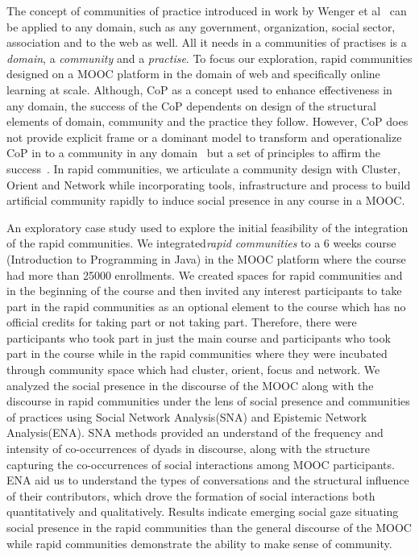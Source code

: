 \documentclass[manuscript,screen,review]{acmart}
\begin{document}
The concept of communities of practice introduced in work by Wenger et al~\cite{wenger1999communities} can be applied to any domain, such as any government, organization, social sector, association and to the web as well. All it needs in a communities of practises is a \textit{domain}, a \textit{community} and a \textit{practise}. To focus our exploration, rapid communities designed on a MOOC platform in the domain of web and specifically online learning at scale. Although, CoP as a concept used to enhance effectiveness in any domain, the success of the CoP dependents on design of the structural elements of domain, community and the practice they follow. However, CoP does not provide explicit frame or a dominant model to transform and operationalize CoP in to a community in any domain~\cite{li2009evolution} but a set of principles to affirm the success~\cite{wenger2002seven}. In rapid communities, we articulate a community design with Cluster, Orient and Network while incorporating tools, infrastructure and process to build artificial community rapidly to induce social presence in any course in a MOOC. 

An exploratory case study used to explore the initial feasibility of the integration of the rapid communities. We integrated\textit{rapid communities} to a 6 weeks course (Introduction to Programming in Java) in the MOOC platform where the course had more than 25000 enrollments. We created spaces for rapid communities and in the beginning of the course and then invited any interest participants to take part in the rapid communities as an optional element to the course which has no official credits for taking part or not taking part. Therefore, there were participants who took part in just the main course and participants who took part in the course while in the rapid communities where they were incubated through community space which had cluster, orient, focus and network. We analyzed the social presence in the discourse of the MOOC along with the discourse in rapid communities under the lens of social presence and communities of practices using Social Network Analysis(SNA) and Epistemic Network Analysis(ENA). SNA methods provided an understand of the  frequency  and  intensity  of  co-occurrences  of  dyads in discourse, along with the structure capturing the co-occurrences of social interactions among MOOC participants. ENA aid us to understand the types of conversations and the structural influence of their contributors, which drove the formation of social interactions both quantitatively and qualitatively. Results indicate emerging social gaze situating social presence in the rapid communities than the general discourse of the MOOC while rapid communities demonstrate the ability to make sense of community.  
\end{document}
